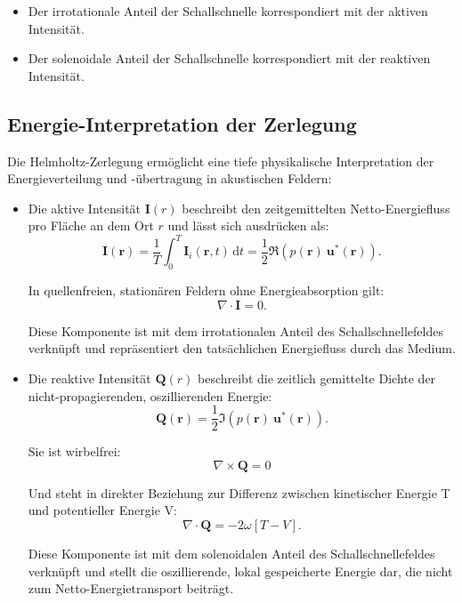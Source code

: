 \begin{itemize}
\item Der irrotationale Anteil der Schallschnelle korrespondiert mit der aktiven Intensität.
\item Der solenoidale Anteil der Schallschnelle korrespondiert mit der reaktiven Intensität.
\end{itemize}

\subsection{Energie-Interpretation der Zerlegung}
 
Die Helmholtz-Zerlegung ermöglicht eine tiefe physikalische Interpretation der Energieverteilung und -übertragung in akustischen Feldern:
 
\begin{itemize}
\item Die aktive Intensität $\mathbf{I}(r)$ beschreibt den zeitgemittelten Netto-Energiefluss pro Fläche an dem Ort $r$ und lässt sich ausdrücken als:
\begin{equation}
\mathbf{I}(\mathbf{r}) = \frac{1}{T}\int_0^T \mathbf{I}_i(\mathbf{r},t)\,\mathrm{d}t = \frac{1}{2}\Re\left( p(\mathbf{r})~\mathbf{u}^*(\mathbf{r})\right).
\end{equation}
 
In quellenfreien, stationären Feldern ohne Energieabsorption gilt:
\begin{equation}
\nabla \cdot \mathbf{I} = 0.
\end{equation}
 
Diese Komponente ist mit dem irrotationalen Anteil des Schallschnellefeldes verknüpft und repräsentiert den tatsächlichen Energiefluss durch das Medium.
 
\item Die reaktive Intensität $\mathbf{Q}(r)$ beschreibt die zeitlich gemittelte Dichte der nicht-propagierenden, oszillierenden Energie:
\begin{equation}
\mathbf{Q}(\mathbf{r}) = \frac{1}{2}\Im\left(p(\mathbf{r})~\mathbf{u}^*(\mathbf{r})\right).
\end{equation}
 
Sie ist wirbelfrei:
\begin{equation}
\nabla \times \mathbf{Q} = 0
\end{equation}
 
Und steht in direkter Beziehung zur Differenz zwischen kinetischer Energie T und potentieller Energie V:
\begin{equation}
\nabla \cdot \mathbf{Q} = -2 \omega [T-V].
\end{equation}
 
Diese Komponente ist mit dem solenoidalen Anteil des Schallschnellefeldes verknüpft und stellt die oszillierende, lokal gespeicherte Energie dar, die nicht zum Netto-Energietransport beiträgt.
\end{itemize}
 
